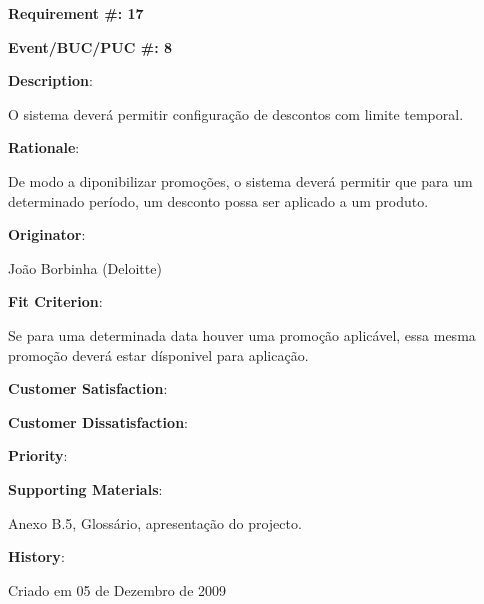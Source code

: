 \pagebreak

\begin{minipage}{0.55\textwidth}
\begin{flushleft}\textbf{Requirement \#: 17}\end{flushleft}
\end{minipage}
\begin{minipage}{0.4\textwidth}
\begin{flushright}\textbf{Event/BUC/PUC \#: 8}\end{flushright}
\end{minipage}

\begin{description}

\item \textbf{Description}:

O sistema deverá permitir configuração de descontos com limite temporal.\\

\item \textbf{Rationale}:

De modo a diponibilizar promoções, o sistema deverá permitir que para um determinado período, um desconto possa ser aplicado a um produto.\\

\item \textbf{Originator}:

João Borbinha (Deloitte)\\

\item \textbf{Fit Criterion}:

Se para uma determinada data houver uma promoção aplicável, essa mesma promoção deverá estar dísponivel para aplicação.\\

\begin{minipage}{0.45\textwidth}
\begin{flushleft}\item \textbf{Customer Satisfaction}:\end{flushleft}
\end{minipage}
\begin{minipage}{0.45\textwidth}
\begin{flushleft}\item \textbf{Customer Dissatisfaction}:\end{flushleft}
\end{minipage}

\item \textbf{Priority}:\\

\item \textbf{Supporting Materials}:

Anexo B.5, Glossário, apresentação do projecto.\\

\item \textbf{History}:

Criado em 05 de Dezembro de 2009\\
\end{description}

